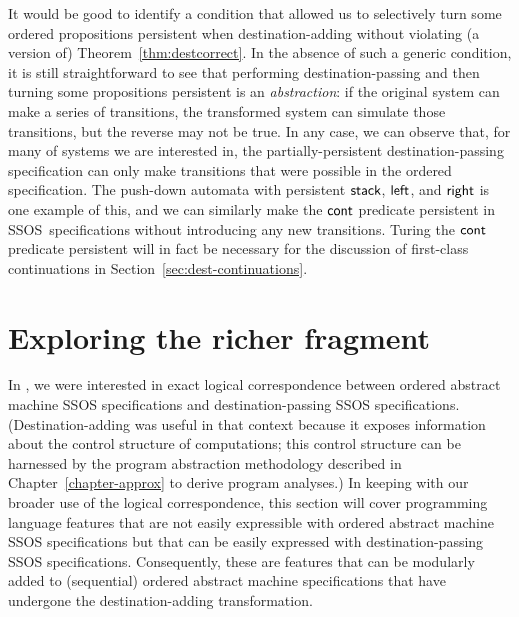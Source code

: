 It would be good to identify a condition that allowed us to
selectively turn some ordered propositions persistent when
destination-adding without violating (a version of)
Theorem~\ref{thm:destcorrect}. In the absence of such a generic
condition, it is still straightforward to see that performing
destination-passing and then turning some propositions persistent is
an {\it abstraction}: if the original system can make a series of
transitions, the transformed system can simulate those transitions,
but the reverse may not be true. In any case, we can observe that, for
many of systems we are interested in, the partially-persistent
destination-passing specification can only make transitions that were
possible in the ordered specification.  The push-down automata with
persistent ${\sf stack}$, ${\sf left}$, and ${\sf right}$ is one
example of this, and we can similarly make the ${\sf cont}$ predicate
persistent in SSOS~specifications without introducing any new
transitions. Turing the ${\sf cont}$ predicate persistent will in
fact be necessary for the discussion of first-class
continuations in Section~\ref{sec:dest-continuations}.

\section{Exploring the richer fragment}

In \cite{simmons11logical}, we were interested in exact logical
correspondence between ordered abstract machine SSOS specifications
and destination-passing SSOS specifications. (Destination-adding was
useful in that context because it exposes information about the
control structure of computations; this control structure can be
harnessed by the program abstraction methodology described in
Chapter~\ref{chapter-approx} to derive program analyses.) In keeping
with our broader use of the logical correspondence, this section will
cover programming language features that are not easily expressible
with ordered abstract machine SSOS specifications but that can be
easily expressed with destination-passing SSOS
specifications. Consequently, these are features that can be modularly
added to (sequential) ordered abstract machine specifications that
have undergone the destination-adding transformation.

